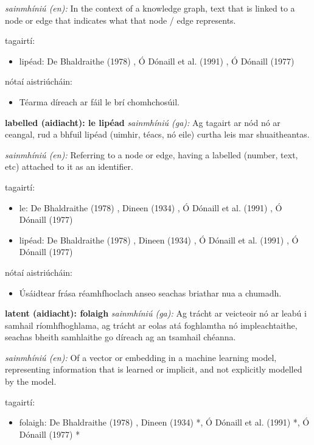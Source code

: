 \documentclass{article}
\begin{document}
\textit{sainmhíniú (en):} In the context of a knowledge graph, text that is linked to a node or edge that indicates what that node / edge represents.

tagairtí:
\begin{itemize}
	\item lipéad: De Bhaldraithe (1978) \cite{de-bhaldraithe}, Ó Dónaill et al. (1991) \cite{focloir-beag}, Ó Dónaill (1977) \cite{odonaill}
\end{itemize}

nótaí aistriúcháin:
\begin{itemize}
	\item Téarma díreach ar fáil le brí chomhchosúil.
\end{itemize}


\textbf{labelled (aidiacht): le lipéad}
\textit{sainmhíniú (ga):} Ag tagairt ar nód nó ar ceangal, rud a bhfuil lipéad (uimhir, téacs, nó eile) curtha leis mar shuaitheantas.

\textit{sainmhíniú (en):} Referring to a node or edge, having a labelled (number, text, etc) attached to it as an identifier.

tagairtí:
\begin{itemize}
	\item le: De Bhaldraithe (1978) \cite{de-bhaldraithe}, Dineen (1934) \cite{dineen}, Ó Dónaill et al. (1991) \cite{focloir-beag}, Ó Dónaill (1977) \cite{odonaill}
	\item lipéad: De Bhaldraithe (1978) \cite{de-bhaldraithe}, Dineen (1934) \cite{dineen}, Ó Dónaill et al. (1991) \cite{focloir-beag}, Ó Dónaill (1977) \cite{odonaill}
\end{itemize}

nótaí aistriúcháin:
\begin{itemize}
	\item Úsáidtear frása réamhfhoclach anseo seachas briathar nua a chumadh.
\end{itemize}


\textbf{latent (aidiacht): folaigh}
\textit{sainmhíniú (ga):} Ag trácht ar veicteoir nó ar leabú i samhail ríomhfhoghlama, ag trácht ar eolas atá foghlamtha nó impleachtaithe, seachas bheith samhlaithe go díreach ag an tsamhail chéanna.

\textit{sainmhíniú (en):} Of a vector or embedding in a machine learning model, representing information that is learned or implicit, and not explicitly modelled by the model.

tagairtí:
\begin{itemize}
	\item folaigh: De Bhaldraithe (1978) \cite{de-bhaldraithe}, Dineen (1934) \cite{dineen}*, Ó Dónaill et al. (1991) \cite{focloir-beag}*, Ó Dónaill (1977) \cite{odonaill}*
\end{itemize}
\end{document}
